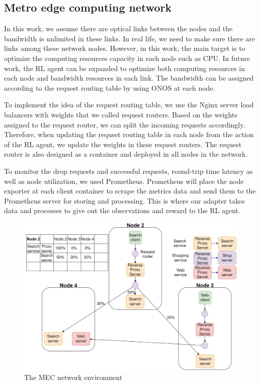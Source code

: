 \documentclass[conference]{IEEEtran}
\begin{document}
\subsection{Metro edge computing network}

In this work, we assume there are optical links between the nodes and the bandwidth is unlimited in these links. In real life, we need to make sure there are links among these network nodes. However, in this work, the main target is to optimize the computing resources capacity in each node such as CPU. In future work, the RL agent can be expanded to optimize both computing resources in each node and bandwidth resources in each link. The bandwidth can be assigned according to the request routing table by using ONOS at each node. 

To implement the idea of the request routing table, we use the Nginx server load balancers with weights that we called request routers. Based on the weights assigned to the request router, we can split the incoming requests accordingly. Therefore, when updating the request routing table in each node from the action of the RL agent, we update the weights in these request routers. The request router is also designed as a container and deployed in all nodes in the network. 

To monitor the drop requests and successful requests, round-trip time latency as well as node utilization, we used Prometheus. Prometheus will place the node exporter at each client container to scrape the metrics data and send them to the Prometheus server for storing and processing. This is where our adapter takes data and processes to give out the observations and reward to the RL agent. 

\begin{figure}[]
    \centering
    \includegraphics[scale = 0.28]{imgs/metro_network_env_client_services_router.png}
    \caption{The MEC network environment}
    \label{fig:metro_network_env_client_services_router}
\end{figure}
\end{document}
